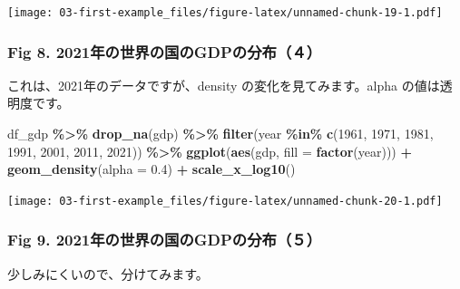 \documentclass[
  xelatex, ja=standard]{bxjsbook}
\newenvironment{Shaded}{\begin{snugshade}}{\end{snugshade}}
\newcommand{\AttributeTok}[1]{\textcolor[rgb]{0.13,0.29,0.53}{#1}}
\newcommand{\DecValTok}[1]{\textcolor[rgb]{0.00,0.00,0.81}{#1}}
\newcommand{\FloatTok}[1]{\textcolor[rgb]{0.00,0.00,0.81}{#1}}
\newcommand{\FunctionTok}[1]{\textcolor[rgb]{0.13,0.29,0.53}{\textbf{#1}}}
\newcommand{\NormalTok}[1]{#1}
\newcommand{\SpecialCharTok}[1]{\textcolor[rgb]{0.81,0.36,0.00}{\textbf{#1}}}
\theoremstyle{definition}
\theoremstyle{definition}
\theoremstyle{definition}
\theoremstyle{definition}
\theoremstyle{remark}
\begin{document}
\texttt{[image: 03-first-example\_files/figure-latex/unnamed-chunk-19-1.pdf]}

\hypertarget{fig-8.-2021ux5e74ux306eux4e16ux754cux306eux56fdux306egdpux306eux5206ux5e03uxff14}{%
\subsubsection{Fig 8. 2021年の世界の国のGDPの分布（４）}\label{fig-8.-2021ux5e74ux306eux4e16ux754cux306eux56fdux306egdpux306eux5206ux5e03uxff14}}

これは、2021年のデータですが、density の変化を見てみます。alpha の値は透明度です。

\begin{Shaded}
\begin{Highlighting}[]
\NormalTok{df\_gdp }\SpecialCharTok{\%\textgreater{}\%} \FunctionTok{drop\_na}\NormalTok{(gdp) }\SpecialCharTok{\%\textgreater{}\%} 
  \FunctionTok{filter}\NormalTok{(year }\SpecialCharTok{\%in\%} \FunctionTok{c}\NormalTok{(}\DecValTok{1961}\NormalTok{, }\DecValTok{1971}\NormalTok{, }\DecValTok{1981}\NormalTok{, }\DecValTok{1991}\NormalTok{, }\DecValTok{2001}\NormalTok{, }\DecValTok{2011}\NormalTok{, }\DecValTok{2021}\NormalTok{)) }\SpecialCharTok{\%\textgreater{}\%}
  \FunctionTok{ggplot}\NormalTok{(}\FunctionTok{aes}\NormalTok{(gdp, }\AttributeTok{fill =} \FunctionTok{factor}\NormalTok{(year))) }\SpecialCharTok{+} \FunctionTok{geom\_density}\NormalTok{(}\AttributeTok{alpha =} \FloatTok{0.4}\NormalTok{) }\SpecialCharTok{+} \FunctionTok{scale\_x\_log10}\NormalTok{()}
\end{Highlighting}
\end{Shaded}

\texttt{[image: 03-first-example\_files/figure-latex/unnamed-chunk-20-1.pdf]}

\hypertarget{fig-9.-2021ux5e74ux306eux4e16ux754cux306eux56fdux306egdpux306eux5206ux5e03uxff15}{%
\subsubsection{Fig 9. 2021年の世界の国のGDPの分布（５）}\label{fig-9.-2021ux5e74ux306eux4e16ux754cux306eux56fdux306egdpux306eux5206ux5e03uxff15}}

少しみにくいので、分けてみます。
\end{document}
